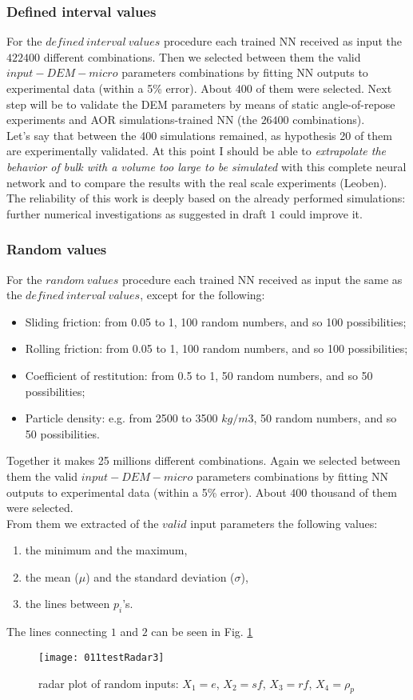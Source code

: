 \subsubsection{Defined interval values}
\label{subsubsection:definedintervalvalues}

For the $defined ~ interval ~ values$ procedure each trained NN received as input the $422400$ different combinations.
Then we selected between them the valid $input-DEM-micro$ parameters combinations by fitting NN outputs to experimental data (within a 5\% error).
About $400$ of them were selected.
Next step will be to validate the DEM parameters by means of static angle-of-repose experiments and AOR simulations-trained NN (the $26400$ combinations).\\

Let's say that between the 400 simulations remained, as hypothesis 20 of them are experimentally validated. At this point I should be able to \textit{extrapolate the behavior of bulk with a volume too large to be simulated} with this complete neural network and to compare the results with the real scale experiments (Leoben).\\

The reliability of this work is deeply based on the already performed simulations: further numerical investigations as suggested in draft $1$ could improve it.\\


\subsubsection{Random values}
\label{subsubsection:randomvalues}

For the $random ~ values$ procedure each trained NN received as input the same as the $defined ~ interval ~ values$, except for the following:
\begin{itemize}
\item{Sliding friction: from 0.05 to 1, 100 random numbers, and so 100 possibilities;}
\item{Rolling friction: from 0.05 to 1, 100 random numbers, and so 100 possibilities;}
\item{Coefficient  of restitution: from 0.5 to 1, 50 random numbers, and so 50 possibilities;}
\item{Particle density: e.g. from 2500 to 3500 $kg/m3$, 50 random numbers, and so 50 possibilities.}
\end{itemize}
Together it makes 25 millions different combinations.
Again we selected between them the valid $input-DEM-micro$ parameters combinations by fitting NN outputs to experimental data (within a 5\% error).
About $400$ thousand of them were selected.\\
From them we extracted of the $valid$ input parameters the following values:
\begin{enumerate}
\item{the minimum and the maximum,}
\item{the mean ($\mu$) and the standard deviation ($\sigma$),}
\item{the lines between $p_i$'s.}
\end{enumerate}
The lines connecting $1$ and $2$ can be seen in Fig. \ref{011testRadar3}

\begin{figure}[!h]
\texttt{[image: 011testRadar3]}
\caption[radar plot of random inputs]{radar plot of random inputs: $X_1 = e$, $X_2 = sf$, $X_3 = rf$, $X_4 = \rho_p$}
\label{011testRadar3}
\end{figure}